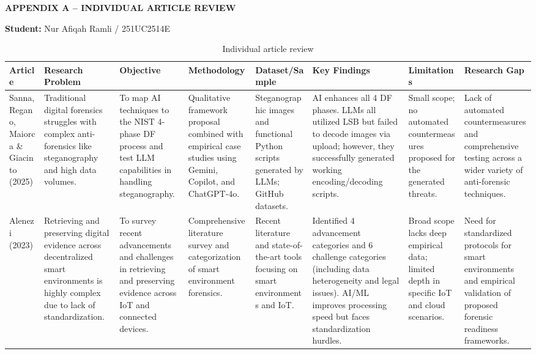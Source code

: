 \documentclass[12pt,a4paper]{article}
\begin{document}
\newpage
\begin{landscape}
{}
\begin{flushleft}
    {\fontsize{14pt}{17pt}\selectfont
    \textbf{APPENDIX A -- INDIVIDUAL ARTICLE REVIEW}}
\end{flushleft}
\vspace{0.3cm}
\textbf{Student:} Nur Afiqah Ramli / 251UC2514E
\begin{table}[H]
\caption{Individual article review}
\label{tab:individual-article-review}
\vspace{-0.2cm}
\fontsize{7.5pt}{9.5pt}\selectfont
\renewcommand{\arraystretch}{1.1}

\begin{tabularx}{\linewidth}{|>{\raggedright\arraybackslash}p{2.2cm}|>{\raggedright\arraybackslash}X|>{\raggedright\arraybackslash}X|>{\raggedright\arraybackslash}X|>{\raggedright\arraybackslash}X|>{\raggedright\arraybackslash}X|>{\raggedright\arraybackslash}X|>{\raggedright\arraybackslash}X|}
\hline

\textbf{Article} &
\textbf{Research Problem} &
\textbf{Objective} &
\textbf{Methodology} &
\textbf{Dataset/Sample} &
\textbf{Key Findings} &
\textbf{Limitations} &
\textbf{Research Gap}
\tabularnewline
\hline

Sanna, Regano, Maiorca \& Giacinto (2025) & Traditional digital forensics struggles with complex anti-forensics like steganography and high data volumes. & To map AI techniques to the NIST 4-phase DF process and test LLM capabilities in handling steganography. & Qualitative framework proposal combined with empirical case studies using Gemini, Copilot, and ChatGPT-4o. & Steganographic images and functional Python scripts generated by LLMs; GitHub datasets. & AI enhances all 4 DF phases. LLMs all utilized LSB but failed to decode images via upload; however, they successfully generated working encoding/decoding scripts. & Small scope; no automated countermeasures proposed for the generated threats. & Lack of automated countermeasures and comprehensive testing across a wider variety of anti-forensic techniques. 
\tabularnewline
\hline

Alenezi (2023) & Retrieving and preserving digital evidence across decentralized smart environments is highly complex due to lack of standardization. & To survey recent advancements and challenges in retrieving and preserving evidence across IoT and connected devices. & Comprehensive literature survey and categorization of smart environment forensics. & Recent literature and state-of-the-art tools focusing on smart environments and IoT. & Identified 4 advancement categories and 6 challenge categories (including data heterogeneity and legal issues). AI/ML improves processing speed but faces standardization hurdles. & Broad scope lacks deep empirical data; limited depth in specific IoT and cloud scenarios. & Need for standardized protocols for smart environments and empirical validation of proposed forensic readiness frameworks. 
\tabularnewline
\hline


\end{tabularx}
\end{table}
\end{landscape}
\end{document}
